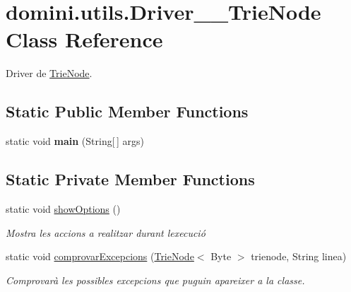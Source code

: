 \hypertarget{classdomini_1_1utils_1_1Driver____TrieNode}{}\section{domini.\+utils.\+Driver\+\_\+\+\_\+\+Trie\+Node Class Reference}
\label{classdomini_1_1utils_1_1Driver____TrieNode}


Driver de \hyperlink{classdomini_1_1utils_1_1TrieNode}{Trie\+Node}.  


\subsection*{Static Public Member Functions}
\begin{DoxyCompactItemize}
\item 
\mbox{\label{classdomini_1_1utils_1_1Driver____TrieNode_a19cb816408fb6b32cca0ea8ae8bc4153}} 
static void {\bfseries main} (String\mbox{[}$\,$\mbox{]} args)
\end{DoxyCompactItemize}
\subsection*{Static Private Member Functions}
\begin{DoxyCompactItemize}
\item 
\mbox{\label{classdomini_1_1utils_1_1Driver____TrieNode_ab9e971ebb4f8e219efaab32c6654243a}} 
static void \hyperlink{classdomini_1_1utils_1_1Driver____TrieNode_ab9e971ebb4f8e219efaab32c6654243a}{show\+Options} ()
\begin{DoxyCompactList}\small\item\em Mostra les accions a realitzar durant l\textquotesingle{}execució \end{DoxyCompactList}\item 
static void \hyperlink{classdomini_1_1utils_1_1Driver____TrieNode_aa763a74162f647ee153c5cea01d371d0}{comprovar\+Excepcions} (\hyperlink{classdomini_1_1utils_1_1TrieNode}{Trie\+Node}$<$ Byte $>$ trienode, String linea)
\begin{DoxyCompactList}\small\item\em Comprovarà les possibles excepcions que puguin apareixer a la classe. \end{DoxyCompactList}\end{DoxyCompactItemize}


